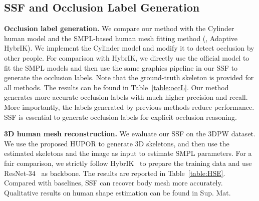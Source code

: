 \subsection{SSF and Occlusion Label Generation}
\label{sec:exp-ssf}
\noindent\textbf{Occlusion label generation.}
We compare our method with the Cylinder human model and the SMPL-based human mesh fitting method (\ie, Adaptive HybrIK). We implement the Cylinder model and modify it to detect occlusion by other people. For comparison with HybrIK, we directly use the official model to fit the SMPL models and then use the same graphics pipeline in our SSF to generate the occlusion labels. Note that the ground-truth skeleton is provided for all methods. The results can be found in Table~\ref{table:occL}. Our method generates 
more accurate occlusion labels with much higher precision and recall. More importantly, the labels generated by previous methods reduce performance. SSF is essential to generate occlusion labels for explicit occlusion reasoning.

\begin{table}
\renewcommand\arraystretch{0.9}
    \setlength{\abovecaptionskip}{0.05cm}
    \setlength{\belowcaptionskip}{-0.15cm}
    \renewcommand\arraystretch{0.5}
    \renewcommand{\baselinestretch}{0.8}
    \small
    \centering
    \caption{\textbf{Evaluation of human mesh recovery on 3DPW dataset.} }
    \label{table:HSE}
\end{table}

\noindent\textbf{3D human mesh reconstruction.}
We evaluate our SSF on the 3DPW dataset. We use the proposed HUPOR to generate 3D skeletons, and then use the estimated skeletons and the image as input to estimate SMPL parameters. For a fair comparison, we strictly follow HybrIK~\cite{li2021hybrik} to prepare the training data and use ResNet-34~\cite{he2016deep} as backbone. The results are reported in Table~\ref{table:HSE}. Compared with baselines, SSF can recover body mesh more accurately. Qualitative results on human shape estimation can be found in Sup. Mat.
